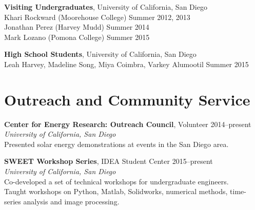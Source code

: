 \documentclass[]{res}
\begin{document}
\begin{resume}
%

\textbf{Visiting Undergraduates}, University of California, San Diego \\
Khari Rockward (Moorehouse College) \hfill Summer 2012, 2013 \\
Jonathan Perez (Harvey Mudd) \hfill Summer 2014 \\
Mark Lozano (Pomona College) \hfill Summer 2015

\textbf{High School Students}, University of California, San Diego \\
Leah Harvey, Madeline Song, Miya Coimbra, Varkey Alumootil \hfill Summer 2015


\section{Outreach and Community Service}
\vspace{0.1in}
%

\textbf{Center for Energy Research: Outreach Council}, Volunteer \hfill 2014--present \\
\textit{University of California, San Diego} \\
Presented solar energy demonstrations at events in the San Diego area.

\textbf{SWEET Workshop Series}, IDEA Student Center \hfill 2015--present \\
\textit{University of California, San Diego} \\
Co-developed a set of technical workshops for undergraduate engineers. \\
Taught workshops on Python, Matlab, Solidworks, numerical methods, time-series
analysis and image processing.



\end{resume}
\end{document}
